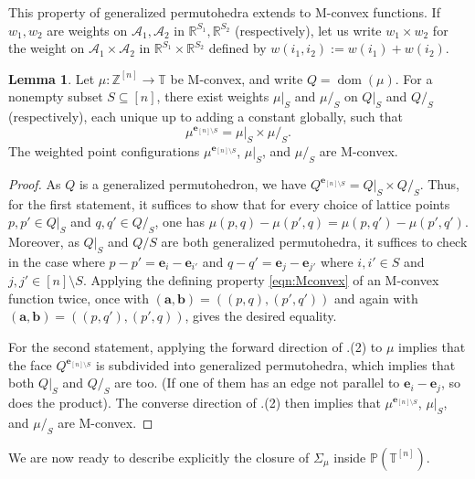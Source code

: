 \documentclass[11pt]{amsart}
\newcommand{\RR}{\mathbb R}
\newcommand{\PP}{\mathbb P}
\newcommand{\ZZ}{\mathbb Z}
\newcommand{\TT}{\mathbb T}
\newcommand{\be}{\mathbf e}
\theoremstyle{definition}
\newtheorem{lem}[thm]{Lemma}
\begin{document}
This property of generalized permutohedra extends to M-convex functions.  If $w_1, w_2$ are weights on $\mathcal A_1, \mathcal A_2$ in $\RR^{S_1}, \RR^{S_2}$ (respectively), let us write $w_1 \times w_2$ for the weight on $\mathcal A_1 \times \mathcal A_2$ in $\RR^{S_1}\times \RR^{S_2}$ defined by $w(i_1,i_2) := w(i_1) + w(i_2)$. 

\begin{lem}\label{lem:Mconvexhopf}
Let $\mu: \ZZ^{[n]}\to \TT$ be M-convex, and write $Q = \operatorname{dom}(\mu)$.  For a nonempty subset $S \subseteq [n]$, there exist weights $\mu|_S$ and $\mu/_S$ on $Q|_S$ and $Q/_S$ (respectively), each unique up to adding a constant globally, such that
\[
\mu^{\be_{[n]\setminus S}} = \mu|_S \times \mu/_S.
\]
The weighted point configurations $\mu^{\be_{[n]\setminus S}}$, $\mu|_S$, and $\mu/_S$ are M-convex.
\end{lem}

\begin{proof}
As $Q$ is a generalized permutohedron, we have $Q^{\be_{[n]\setminus S}} = Q|_S \times Q/_S$.
Thus, for the first statement, it suffices to show that for every choice of lattice points $p,p'\in Q|_S$ and $q,q'\in Q/_S$, one has $\mu(p,q) - \mu(p',q) = \mu(p,q') - \mu(p',q')$.  Moreover, as $Q|_S$ and $Q/ S$ are both generalized permutohedra, it suffices to check in the case where $p - p'= \be_i - \be_{i'}$ and $q - q' = \be_j- \be_{j'}$ where $i,i'\in S$ and $j,j'\in [n]\setminus S$.  Applying the defining property \eqref{eqn:Mconvex} of an M-convex function twice,  once with $(\mathbf a, \mathbf b) = ((p,q),(p',q'))$ and again with $(\mathbf a, \mathbf b) = ((p,q'),(p',q))$, gives the desired equality.

For the second statement, applying the forward direction of .(2) to $\mu$ implies that the face $Q^{\be_{[n]\setminus S}}$ is subdivided into generalized permutohedra, which implies that both $Q|_S$ and $Q/_S$ are too. (If one of them has an edge not parallel to $\be_i - \be_j$, so does the product).  The converse direction of .(2) then implies that $\mu^{\be_{[n]\setminus S}}$, $\mu|_S$, and $\mu/_S$ are M-convex.
\end{proof}





We are now ready to describe explicitly the closure of $\Sigma_\mu$ inside $\PP(\TT^{[n]})$.
\end{document}
